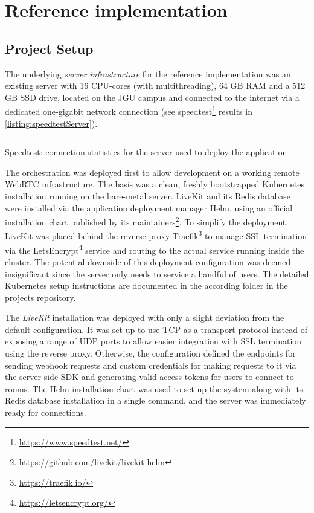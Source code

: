 \chapter{Reference implementation}
\label{ch:implementation}

\section{Project Setup}
\label{sec:project-setup}

The underlying \emph{server infrastructure} for the reference implementation was an existing server with 16 \ac{CPU}-cores (with multithreading), 64 \ac{GB} \ac{RAM} and a 512 \ac{GB} \ac{SSD} drive, located on the \ac{JGU} campus and connected to the internet via a dedicated one-gigabit network connection (see speedtest\footnote{\url{https://www.speedtest.net/}} results in \autoref{listing:speedtestServer}).

\begin{listing}[!ht]
\inputminted{text}{04_Artefakte/03_Listings/speedtest-server.txt}
\caption{Speedtest: connection statistics for the server used to deploy the application\protect}
\label{listing:speedtestServer}
\end{listing}

The orchestration was deployed first to allow development on a working remote WebRTC infrastructure.
The basis was a clean, freshly bootstrapped Kubernetes installation running on the bare-metal server.
LiveKit and its Redis database were installed via the application deployment manager Helm, using an official installation chart published by its maintainers\footnote{\url{https://github.com/livekit/livekit-helm}}.
To simplify the deployment, LiveKit was placed behind the reverse proxy Traefik\footnote{\url{https://traefik.io/}} to manage \ac{SSL} termination via the LetsEncrypt\footnote{\url{https://letsencrypt.org/}} service and routing to the actual service running inside the cluster.
The potential downside of this deployment configuration was deemed insignificant since the server only needs to service a handful of users.
The detailed Kubernetes setup instructions are documented in the according folder in the project\textquotesingle s repository.

The \emph{LiveKit} installation was deployed with only a slight deviation from the default configuration.
It was set up to use \ac{TCP} as a transport protocol instead of exposing a range of UDP ports to allow easier integration with \ac{SSL} termination using the reverse proxy.
Otherwise, the configuration defined the endpoints for sending webhook requests and custom credentials for making requests to it via the server-side \ac{SDK} and generating valid access tokens for users to connect to rooms.
The Helm installation chart was used to set up the system along with its Redis database installation in a single command, and the server was immediately ready for connections.

